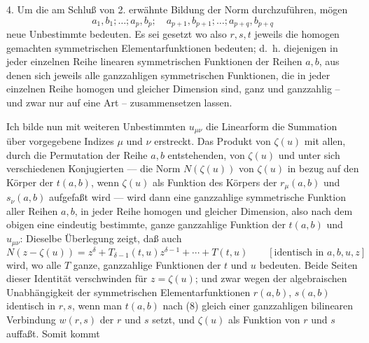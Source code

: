 4. Um die am Schluß von 2. erwähnte Bildung der Norm durchzuführen, mögen
\[
 a_1,b_1;\ldots; a_p,b_p;\quad a_{p+1},b_{p+1};\ldots; a_{p+q},b_{p+q}
\]
neue Unbestimmte bedeuten. Es sei gesetzt
wo also $r,s,t$ jeweils die homogen gemachten symmetrischen Elementarfunktionen bedeuten; d.~h. diejenigen in jeder einzelnen Reihe linearen symmetrischen Funktionen der Reihen $a,b$, aus denen sich jeweils alle ganzzahligen symmetrischen Funktionen, die in jeder einzelnen Reihe homogen und gleicher Dimension sind, ganz und ganzzahlig -- und zwar nur auf eine Art -- zusammensetzen lassen.

Ich bilde nun mit weiteren Unbestimmten $u_{\mu\nu}$ die Linearform
die Summation über vorgegebene Indizes $\mu$ und $\nu$ erstreckt. Das Produkt von $\zeta(u)$ mit allen, durch die Permutation der Reihe $a,b$ entstehenden, von $\zeta(u)$ und unter sich verschiedenen Konjugierten --- die Norm $N(\zeta(u))$ von $\zeta(u)$ in bezug auf den Körper der $t(a,b)$, wenn $\zeta(u)$ als Funktion des Körpers der $r_\mu(a,b)$ und $s_\nu(a,b)$ aufgefaßt wird --- wird dann eine ganzzahlige symmetrische Funktion aller Reihen $a,b$, in jeder Reihe homogen und gleicher Dimension, also nach dem obigen eine eindeutig bestimmte, ganze ganzzahlige Funktion der $t(a,b)$ und $u_{\mu\nu}$:
Dieselbe Überlegung zeigt, daß auch
\[
N(z-\zeta(u))=z^\delta+T_{\delta-1}(t,u)z^{\delta-1}+\cdots+T(t,u)
\qquad[\text{identisch in }a,b,u,z]
\]
wird, wo alle $T$ ganze, ganzzahlige Funktionen der $t$ und $u$ bedeuten. Beide Seiten dieser Identität verschwinden für $z=\zeta(u)$; und zwar wegen der algebraischen Unabhängigkeit der symmetrischen Elementarfunktionen $r(a,b)$, $s(a,b)$ identisch in $r,s$, wenn man $t(a,b)$ nach (8) gleich einer ganzzahligen bilinearen Verbindung $w(r,s)$ der $r$ und $s$ setzt, und $\zeta(u)$ als Funktion von $r$ und $s$ auffaßt. Somit kommt
\addtocounter{footnote}{1}

